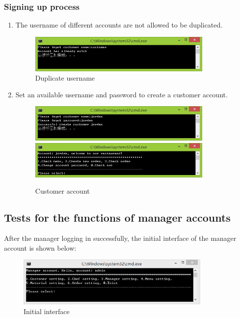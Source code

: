 \documentclass{article}
\begin{document}
\subsubsection{Signing up process}
\begin{enumerate}
    \item The username of different accounts are not allowed to be duplicated.
        \begin{figure}[H]
        \centering
        \includegraphics[width=0.85\textwidth]{signup/10.jpg}
        \caption{Duplicate username}
        \end{figure}
    \item Set an available username and password to create a customer account.
        \begin{figure}[H]
        \centering
        \includegraphics[width=0.85\textwidth]{signup/11.jpg}
        \includegraphics[width=0.85\textwidth]{signup/12.jpg}
        \caption{Customer account}
        \end{figure}
\end{enumerate}






\subsection{Tests for the functions of manager accounts}
After the manager logging in successfully, the initial interface of the manager account is shown below:
\begin{figure}[H]
    \centering
    \includegraphics[width=0.85\textwidth]{manager0000.png}
    \caption{Initial interface}
\end{figure}
\end{document}
